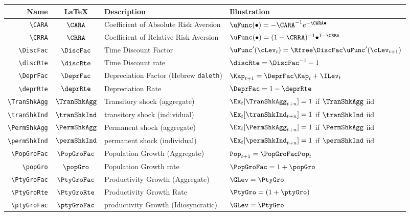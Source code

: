 \documentclass[12pt]{\econtex}
\begin{document}
\hypertarget{Parameters}{}
\begin{table}[ht]
  \centering
  \begin{tabular}{|>{\ttfamily}rcll|} 		
    \hline
    Name    & \LaTeX         & Description & Illustration
    \\ \hline
    \verb|\CARA|        & $\CARA$       & Coefficient of Absolute Risk Aversion &$\uFunc(\bullet)=-\CARA^{-1} e^{-\CARA \bullet}$
    \\ \verb|\CRRA|        & $\CRRA$       & Coefficient of Relative Risk Aversion & $\uFunc(\bullet)=(1-\CRRA)^{-1}\bullet^{1-\CRRA}$ 
    \\ \verb|\DiscFac|     & $\DiscFac$    & Time Discount Factor & $\uFunc^{\prime}(\cLev_{t}) =  \Rfree \DiscFac \uFunc^{\prime}(\cLev_{t+1})$
    \\ \verb|\discRte|     & $\discRte$    & Time Discount rate & $\discRte=\DiscFac^{-1}-1$
    \\ \verb|\DeprFac|     & $\DeprFac$    & Depreciation Factor (Hebrew \texttt{daleth}) & $\Kap_{t+1} = \DeprFac \Kap_{t}+\ILev_{t}$
    \\ \verb|\deprRte|     & $\deprRte$    & Depreciation Rate & $\DeprFac = 1-\deprRte$
    \\ \verb|\TranShkAgg|  & $\TranShkAgg$ & Transitory shock (aggregate) & $\Ex_{t}[\TranShkAgg_{t+n}]=1$ if $\TranShkAgg$ iid
    \\ \verb|\tranShkInd|  & $\tranShkInd$ & transitory shock (individual) &  $\Ex_{t}[\tranShkInd_{t+n}]=1$ if $\tranShkInd$ iid
    \\ \verb|\PermShkAgg|  & $\PermShkAgg$ & Permanent shock (aggregate) & $\Ex_{t}[\PermShkAgg_{t+n}]=1$ if $\PermShkAgg$ iid
    \\ \verb|\permShkInd|  & $\permShkInd$ & permanent shock (individual) & $\Ex_{t}[\permShkInd_{t+n}]=1$ if $\permShkInd$ iid
    \\ \verb|\PopGroFac|  & $\PopGroFac$ & Population Growth (Aggregate) & $\mathtt{Pop}_{t+1} = \PopGroFac \mathtt{Pop}_{t}$
    \\ \verb|\popGro|  & $\popGro$ & Population Growth rate & $\PopGroFac = 1 + \popGro$
    \\ \verb|\PtyGroFac|  & $\PtyGroFac$ & Productivity Growth (Aggregate) & $\GLev = \PtyGro$
    \\ \verb|\PtyGroRte|  & $\PtyGroRte$ & Productivity Growth Rate & $\PtyGro = (1+\ptyGro)$
    \\ \verb|\ptyGroFac|  & $\ptyGroFac$ & productivity Growth (Idiosyncratic) & $\GLev = \PtyGro$

\end{tabular}
\end{table}
\end{document}
